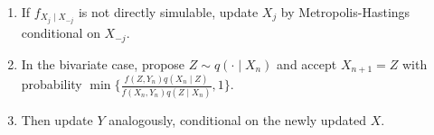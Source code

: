 \begin{method} \label{method:metropolis-within-gibbs} 
\begin{enumerate}[label=(\roman*)]
\setlength{\itemsep}{0pt}
\item If $f_{X_j\mid X_{-j}}$ is not directly simulable, update $X_j$ by Metropolis-Hastings conditional on $X_{-j}$.
\item In the bivariate case, propose $Z\sim q(\cdot\mid X_n)$ and accept $X_{n+1}=Z$ with probability $\min\{\frac{f(Z,Y_n)q(X_n\mid Z)}{f(X_n,Y_n)q(Z\mid X_n)},1\}$.
\item Then update $Y$ analogously, conditional on the newly updated $X$.
\end{enumerate}
\end{method}
